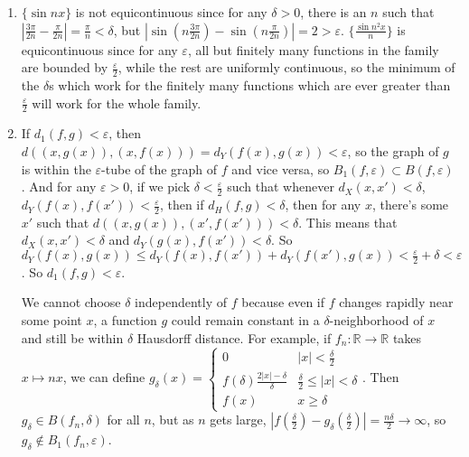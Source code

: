 \documentclass{article}
\newcommand\RR{\mathbb R}
\begin{document}
\begin{enumerate}
   \item $\{\sin nx\}$ is not equicontinuous since for any $\delta>0$, there is
      an $n$ such that $|\frac{3\pi}{2n} - \frac{\pi}{2n}| = \frac\pi{n} <
      \delta$, but $|\sin(n\frac{3\pi}{2n}) - \sin(n\frac{\pi}{2n})| = 2 >
      \varepsilon$.  $\{\frac{\sin n^2x}n\}$ is equicontinuous since for any
      $\varepsilon$, all but finitely many functions in the family are bounded
      by $\frac\varepsilon2$, while the rest are uniformly continuous, so the
      minimum of the $\delta$s which work for the finitely many functions which
      are ever greater than $\frac\varepsilon2$ will work for the whole family.

   \item If $d_1(f,g) < \varepsilon$, then $d( (x,g(x)), (x,f(x))) =
      d_Y(f(x),g(x)) < \varepsilon$, so the graph of $g$ is within the
      $\varepsilon$-tube of the graph of $f$ and vice versa, so
      $B_1(f,\varepsilon) \subset B(f,\varepsilon)$. And for any
      $\varepsilon>0$, if we pick $\delta<\frac\varepsilon2$ such that whenever
      $d_X(x,x') < \delta$, $d_Y(f(x),f(x')) < \frac\varepsilon2$, then if
      $d_H(f,g) < \delta$, then for any $x$, there's some $x'$ such that $d(
      (x,g(x)), (x',f(x'))) < \delta$. This means that $d_X(x,x') < \delta$ and
      $d_Y(g(x),f(x')) < \delta$. So $d_Y(f(x),g(x)) \leq d_Y(f(x),f(x')) +
      d_Y(f(x'),g(x)) < \frac\varepsilon2 + \delta < \varepsilon$. So $d_1(f,g)
      < \varepsilon$.
      
      We cannot choose $\delta$ independently of $f$ because even if $f$ changes
      rapidly near some point $x$, a function $g$ could remain constant in a
      $\delta$-neighborhood of $x$ and still be within $\delta$ Hausdorff
      distance. For example, if $f_n : \RR \to \RR$ takes $x \mapsto nx$, we can
      define $g_\delta(x) = \begin{cases} 0 & |x| < \frac\delta2 \\
         f(\delta)\frac{2|x|-\delta}\delta & \frac\delta2 \leq |x| < \delta
         \\ f(x) & x \geq \delta \end{cases}$. Then $g_\delta \in B(f_n,\delta)$
      for all $n$, but as $n$ gets large, $|f(\frac\delta2) -
      g_\delta(\frac\delta2)| = \frac{n\delta}2 \to \infty$, so $g_\delta
      \not\in B_1(f_n,\varepsilon)$.
\end{enumerate}
\end{document}
